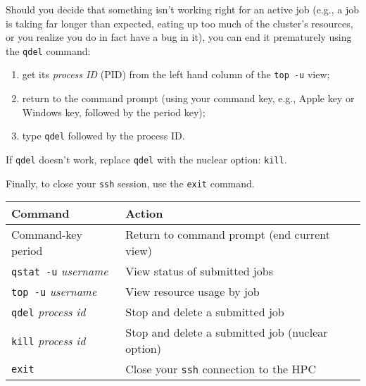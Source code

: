 \documentclass[12pt,letterpaper]{article}
\begin{document}
Should you decide that something isn't working right for an active job (e.g., a job is taking far longer than expected, eating up too much of the cluster's resources, or you realize you do in fact have a bug in it), you can end it prematurely using the \texttt{qdel} command:
\begin{enumerate}
	\item get its \emph{process ID} (PID) from the left hand column of the \texttt{top -u} view;
	\item return to the command prompt (using your command key, e.g., Apple key or Windows key, followed by the period key);
	\item type \texttt{qdel} followed by the process ID.
\end{enumerate}
If \texttt{qdel} doesn't work, replace \texttt{qdel} with the nuclear option:  \texttt{kill}.


Finally, to close your \texttt{ssh} session, use the \texttt{exit} command.


\begin{center}
		\begin{tabular}{ll}
			\hline
			\hline
			\textbf{Command} & \textbf{Action} \\
			\hline
			Command-key period & Return to command prompt (end current view)\\
			\texttt{qstat -u} \emph{username} &  View status of submitted jobs\\
			\texttt{top -u} \emph{username} & View resource usage by job \\
			\texttt{qdel} \emph{process id} & Stop and delete a submitted job \\
			\texttt{kill} \emph{process id} & Stop and delete a submitted job (nuclear option) \\
			\texttt{exit}  & Close your \texttt{ssh} connection to the HPC\\
			\hline
			\hline
		\end{tabular}
\end{center}
\end{document}
